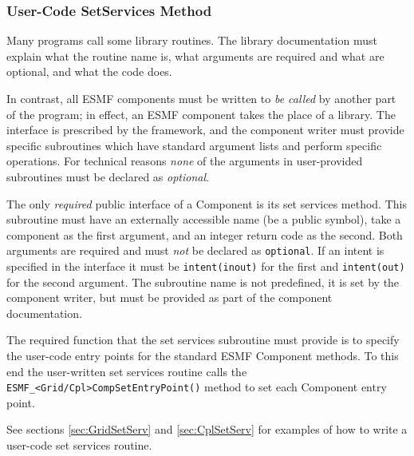 %

\subsubsection{User-Code SetServices Method}

Many programs call some library routines.  The library
documentation must explain what the routine name is, what arguments 
are required and what are optional, and what the code does.  

In contrast, all ESMF components must be written to {\it be called}
by another part of the program; in effect, an ESMF component takes the 
place of a library.  The interface is prescribed by the framework,
and the component writer must provide specific subroutines which 
have standard argument lists and perform specific operations.
For technical reasons {\em none} of the arguments in user-provided subroutines
must be declared as {\em optional}.

The only {\em required} public interface of a Component is its
set services method.  This subroutine must have an
externally accessible name (be a public symbol), take a component
as the first argument, and an integer return code as the second. 
Both arguments are required and must {\em not} be declared as 
{\tt optional}. If an intent is specified in the interface it must be 
{\tt intent(inout)} for the first and {\tt intent(out)} for the 
second argument. The subroutine name is not predefined, it is set by the
component writer, but must be provided as part of the component 
documentation.

The required function that the set services subroutine must provide is to
specify the user-code entry points for the standard ESMF Component methods. To
this end the user-written set services routine calls the
{\tt ESMF\_<Grid/Cpl>CompSetEntryPoint()} method to set each 
Component entry point.

See sections \ref{sec:GridSetServ} and \ref{sec:CplSetServ} for examples of
how to write a user-code set services routine.

